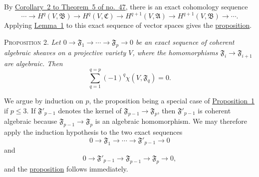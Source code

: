 By \hyperref[fac:II:3:thm:5:cor:2]{Corollary~2 to Theorem~5 of
no.~47}, there is an exact cohomology sequence
\label{fac:III:6:no:79:prop:1:cohomology-sequence}
\[
\cdots\longrightarrow H^q(V,\mathfrak B)
\longrightarrow H^q(V,\mathfrak C)
\longrightarrow H^{q+1}(V,\mathfrak A)
\longrightarrow H^{q+1}(V,\mathfrak B)\longrightarrow\cdots .
\]
Applying \hyperref[fac:III:6:no:79:lemma:1]{Lemma~1} to this exact sequence of vector spaces gives the
\hyperref[fac:III:6:no:79:prop:1]{proposition}.

\label{fac:III:6:no:79:prop:2}
\textsc{Proposition 2.} \textit{Let
$0\longrightarrow\mathfrak F_1\longrightarrow\cdots
\longrightarrow\mathfrak F_p\longrightarrow0$ be an exact sequence
of coherent algebraic sheaves on a projective variety $V$, where the
homomorphisms $\mathfrak F_i\to\mathfrak F_{i+1}$ are algebraic. Then}
\label{fac:III:6:no:79:prop:2:formula}
\[
\sum_{q=1}^{q=p}(-1)^q\chi(V,\mathfrak F_q)=0.
\]

We argue by induction on $p$, the proposition being a special case of
\hyperref[fac:III:6:no:79:prop:1]{Proposition~1} if $p\leq3$. If $\mathfrak F'_{p-1}$ denotes the kernel
of $\mathfrak F_{p-1}\to\mathfrak F_p$, then
$\mathfrak F'_{p-1}$ is coherent algebraic because
$\mathfrak F_{p-1}\to\mathfrak F_p$ is an algebraic homomorphism. We
may therefore apply the induction hypothesis to the two exact
sequences
\label{fac:III:6:no:79:prop:2:sequences}
\[
0\longrightarrow\mathfrak F_1\longrightarrow\cdots
\longrightarrow\mathfrak F'_{p-1}\longrightarrow0
\]
and
\[
0\longrightarrow\mathfrak F'_{p-1}\longrightarrow
\mathfrak F_{p-1}\longrightarrow\mathfrak F_p\longrightarrow0,
\]
and the \hyperref[fac:III:6:no:79:prop:2]{proposition} follows immediately.
